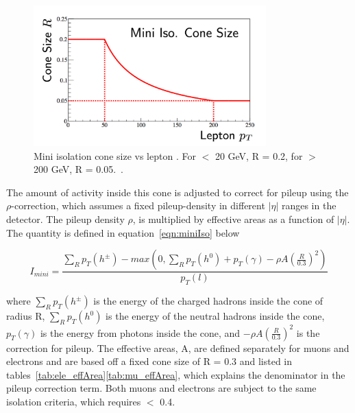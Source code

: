 \begin{figure}[hbtp]
 \begin{center}
   \includegraphics[width=0.8\textwidth]{ch4_figs/miniIso.pdf}
   \caption[Mini isolation cone size vs \pt]{Mini isolation cone size vs lepton \pt. For \pt $<$ 20 GeV, R = 0.2, for \pt $>$ 200 GeV, R = 0.05.~\cite{miniIso}.}
   \label{fig:miniIsoConeSize}
 \end{center}
\end{figure}


\noindent The amount of activity inside this cone is adjusted to correct for pileup using the $\rho$-correction, which assumes a fixed pileup-density in different $|\eta|$ ranges in the detector. The
pileup density $\rho$, is multiplied by effective areas as a function of $|\eta|$. The \miniIso quantity is defined in equation~\ref{eqn:miniIso} below

\begin{equation}
\label{eqn:miniIso}
 I_{mini} = \frac{\sum_{R}p_{T}(h^{\pm}) - max(0,\sum_{R}p_{T}(h^{0}) + p_{T}(\gamma) - \rho A (\frac{R}{0.3})^{2}) }{p_{T}(l)}
\end{equation}

\noindent where $\sum_{R}p_{T}(h^{\pm})$ is the energy of the charged hadrons inside the cone of radius R, $\sum_{R}p_{T}(h^{0})$ is the energy of the neutral hadrons inside the cone, $p_{T}(\gamma)$ is
the energy from photons inside the cone, and $-\rho A (\frac{R}{0.3})^{2}$ is the correction for pileup. The effective areas, A, are defined separately for muons and electrons and are based off a fixed
cone size of R = 0.3 and listed in tables~\ref{tab:ele_effArea}\ref{tab:mu_effArea}, which explains the denominator in the pileup correction term. Both muons and electrons are subject to the same isolation criteria, which requires \miniIso $<$ 0.4.

